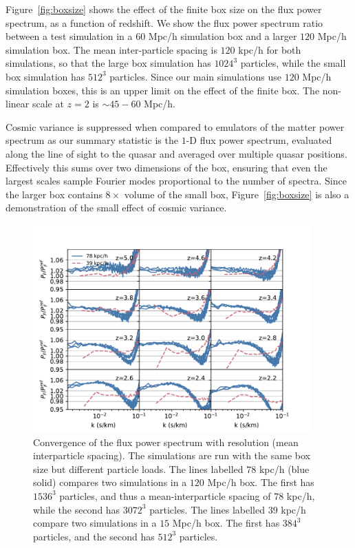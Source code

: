 \documentclass[a4paper,11pt]{article}
\newcommand{\Lya}{Lyman-$\alpha$}
\begin{document}
Figure~\ref{fig:boxsize} shows the effect of the finite box size on the flux power spectrum, as a function of redshift. We show the flux power spectrum ratio between a test simulation in a $60$ Mpc/h simulation box and a larger $120$ Mpc/h simulation box. The mean inter-particle spacing is $120$ kpc/h for both simulations, so that the large box simulation has $1024^3$ particles, while the small box simulation has $512^3$ particles. Since our main simulations use $120$ Mpc/h simulation boxes, this is an upper limit on the effect of the finite box. The non-linear scale at $z=2$ is $\sim 45 - 60$ Mpc/h.

Cosmic variance is suppressed when compared to emulators of the matter power spectrum as our summary statistic is the $1$-D flux power spectrum, evaluated along the line of sight to the quasar and averaged over multiple quasar positions. Effectively this sums over two dimensions of the box, ensuring that even the largest scales sample Fourier modes proportional to the number of spectra. Since the larger box contains $8\times$ volume of the small box, Figure~\ref{fig:boxsize} is also a demonstration of the small effect of cosmic variance.

\begin{figure}
\includegraphics[width=0.95\textwidth,trim={0 0 1cm 0},clip]{figures/resolution-convergence.pdf}
 \caption{Convergence of the flux power spectrum with resolution (mean interparticle spacing). The simulations are run with the same box size but different particle loads. The lines labelled $78$ kpc/h (blue solid) compares two simulations in a $120$ Mpc/h box. The first has $1536^3$ particles, and thus a mean-interparticle spacing of $78$ kpc/h, while the second has $3072^3$ particles. The lines labelled $39$ kpc/h compare two simulations in a $15$ Mpc/h box. The first has $384^3$ particles, and the second has $512^3$ particles.}
 \label{fig:resolution}
\end{figure}
\end{document}
